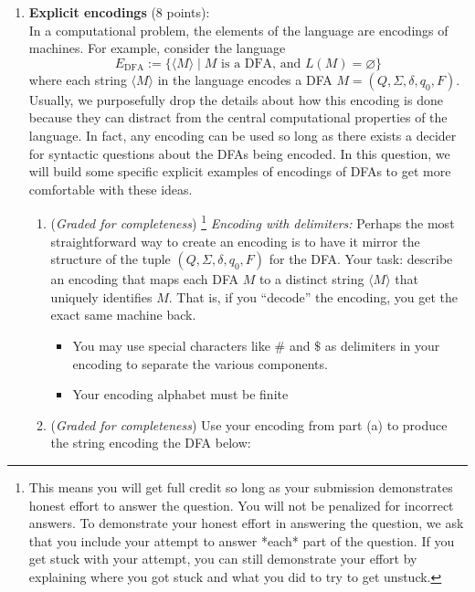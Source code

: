 \documentclass[12pt, oneside]{article}
\newcommand{\gradeComplete}{({\it Graded for completeness}) }
\newcommand{\gradeCompleteFirst}{\gradeComplete\footnote{This means you will 
get full credit so long as your submission demonstrates honest effort to 
answer the question. You will not be penalized for incorrect answers. 
To demonstrate your honest effort in answering the question, we ask 
that you include your attempt to answer *each* part of the question. 
If you get stuck with your attempt, you can still demonstrate 
your effort by explaining where you got stuck and what 
you did to try to get unstuck.} }
\begin{document}
\begin{enumerate} 
\item \textbf{Explicit encodings} (8 points): \\
In a computational problem, the elements of the language are encodings of machines. For example, 
consider the language 
\[
E_{\mathrm{DFA}} := \{ \langle M \rangle \mid M \text{ is a DFA, and } L(M) = \varnothing \}
\]
where each string $\langle M \rangle$ in the language encodes a DFA $M = (Q, \Sigma, \delta, q_0, F)$.
Usually, we purposefully drop the details about how this encoding is done because they can distract from 
the central computational 
properties of the language. In fact, any encoding can be used so long as there exists a decider for 
syntactic questions about the DFAs being encoded. 
In this question, we will build some specific 
explicit examples of encodings of DFAs to get more comfortable with these ideas.

\begin{enumerate}
\item\gradeCompleteFirst \textit{Encoding with delimiters:} Perhaps the most straightforward
way to create an encoding is to have it mirror the structure of the tuple $(Q, \Sigma, \delta, q_0, F)$ 
for the DFA. Your task: describe an encoding that maps each DFA $M$ to a distinct string $\langle M \rangle$ 
that uniquely identifies $M$. That is, if you ``decode'' the encoding, you get the exact same machine back. 

\begin{itemize}[itemsep=-10pt]
\item You may use special characters like $\#$ and $\$$ as delimiters in your encoding to separate the 
various components. \\
\item Your encoding alphabet must be finite
\end{itemize}
\item\gradeComplete Use your encoding from part (a) to produce
the string encoding the DFA below:
\begin{center}
\end{center}


\end{enumerate}
\end{enumerate}
\end{document}
